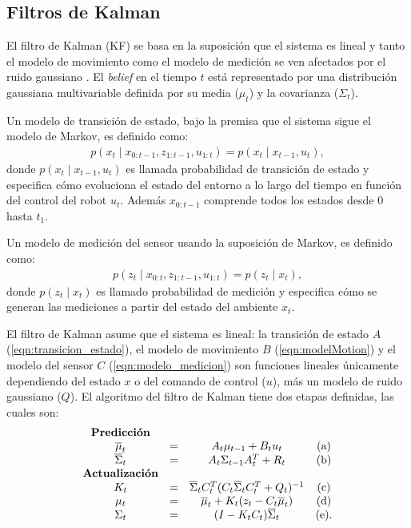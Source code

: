 \subsection{Filtros de Kalman}
El filtro de Kalman (KF) se basa en la suposición que el sistema es lineal y tanto 
el modelo de movimiento como el modelo de medición se ven afectados por el ruido 
gaussiano \cite{jetto1999development}. El \textit{belief} en el tiempo $t$ está 
representado por una distribución gaussiana multivariable definida por su media 
($\mu_{t}$) y la covarianza ($\Sigma_{t}$).

Un modelo de transici\'on de estado, bajo la premisa que el sistema sigue el modelo de 
Markov, es definido como:
\begin{align}
\label{eqn:transicion_estado}
p(x_{t}\mid x_{0:t-1}, z_{1:t-1}, u_{1:t}) = p(x_{t}\mid x_{t-1}, u_{t}),
\end{align}
donde $p(x_{t}\mid x_{t-1}, u_{t})$ es llamada probabilidad de transición de estado 
y especifica cómo evoluciona el estado del entorno a lo largo del tiempo en función 
del control del robot $u_{t}$. Además $x_{0:t-1}$ comprende todos los estados desde 
$0$ hasta $t_1$. 

Un modelo de medici\'on del sensor usando la suposición de Markov, es definido como:
\begin{align}
\label{eqn:modelo_medicion}
p(z_{t}\mid x_{0:t}, z_{1:t-1}, u_{1:t}) = p (z_{t}\mid x_{t}),
\end{align}
donde $p(z_{t}\mid x_{t})$ es llamado probabilidad de medición y especifica cómo se 
generan las mediciones a partir del estado del ambiente $x_{t}$.

El filtro de Kalman asume que el sistema es lineal: la transición de estado 
$A$ (\ref{eqn:transicion_estado}), el modelo de movimiento $B$ (\ref{eqn:modelMotion})  
y el modelo del sensor $C$ (\ref{eqn:modelo_medicion}) son funciones lineales únicamente 
dependiendo del estado $x$ o del comando de control ($u$), más un modelo 
de ruido gaussiano ($Q$). El algoritmo del filtro de Kalman tiene dos etapas 
definidas, las cuales son:
\begin{equation*}
\label{eqn: Kalman Filter}
\begin{matrix}
\textrm{\textbf{Predicción}}\\
\overline{\mu}_{t} &= &A_{t}\mu_{t-1} + B_{t} u_{t} &\textrm{(a)}\\
\overline{\Sigma}_{t} &= &A_{t}\Sigma_{t-1} A_{t}^{T} + R_{t} &\textrm{(b)}\\
\textrm{\textbf{Actualización}}\\
K_{t} &= &\overline{\Sigma}_{t}C_{t}^{T}(C_{t}\overline{\Sigma}_{t}C_{t}^{T} + Q_{t})^{-1} &\textrm{(c)}\\
\mu_{t} &= &\overline{\mu}_{t} + K_{t}(z_{t} - C_{t}\overline{\mu}_{t}) &\textrm{(d)}\\
\Sigma_{t} &= &(I - K_{t}C_{t})\overline{\Sigma}_{t} &\textrm{(e)}.\\
\end{matrix}
\end{equation*}


